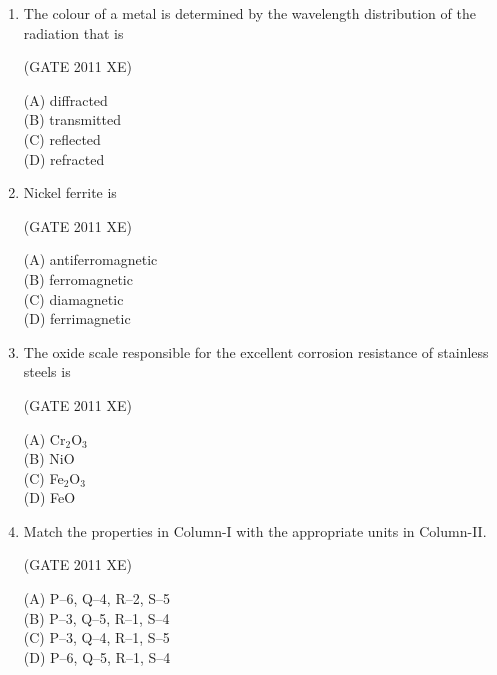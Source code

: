 \documentclass[journal,12pt,onecolumn]{IEEEtran}
\begin{document}
\begin{enumerate}
\begin{enumerate}
\begin{enumerate}
\hfill{(GATE 2011 XE)}\\
\begin{multicols}{4}
(A) Superalloy \\
(B) Super Invar \\
(C) Spinel \\
(D) $\alpha$-brass
\end{multicols}


\item The colour of a metal is determined by the wavelength distribution of the radiation that is

\hfill{(GATE 2011 XE)}\\
\begin{multicols}{4}
(A) diffracted \\
(B) transmitted \\
(C) reflected \\
(D) refracted
\end{multicols}

\newpage

\item Nickel ferrite is

\hfill{(GATE 2011 XE)}\\
\begin{multicols}{4}
(A) antiferromagnetic \\
(B) ferromagnetic \\
(C) diamagnetic \\
(D) ferrimagnetic
\end{multicols}

\item The oxide scale responsible for the excellent corrosion resistance of stainless steels is

\hfill{(GATE 2011 XE)}\\
\begin{multicols}{4}
(A) Cr$_2$O$_3$ \\
(B) NiO \\
(C) Fe$_2$O$_3$ \\
(D) FeO
\end{multicols}

\item Match the properties in Column-I with the appropriate units in Column-II.



\hfill{(GATE 2011 XE)}\\
\begin{multicols}{2}
(A) P–6, Q–4, R–2, S–5 \\
(B) P–3, Q–5, R–1, S–4 \\
(C) P–3, Q–4, R–1, S–5 \\
(D) P–6, Q–5, R–1, S–4
\end{multicols}


\end{enumerate}
\end{enumerate}
\end{enumerate}
\end{document}

